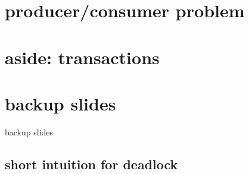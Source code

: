 \documentclass[aspectratio=169]{mytalk}
\begin{document}
\section{producer/consumer problem}




\section{aside: transactions}


\begin{frame}
\end{frame}

\begin{frame}
\end{frame}

\begin{frame}
\end{frame}

\section{backup slides}
\begin{frame}{backup slides}
\end{frame}

\subsection{short intuition for deadlock}






\end{document}
